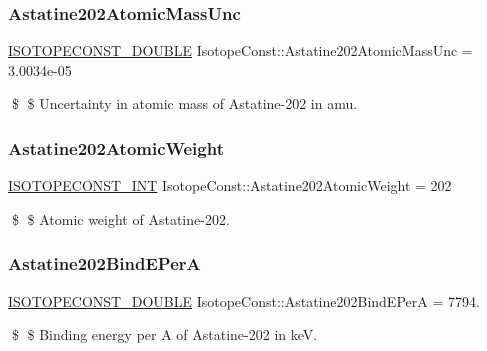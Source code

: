 \subsubsection{\texorpdfstring{Astatine202\+Atomic\+Mass\+Unc}{Astatine202AtomicMassUnc}}
{\footnotesize\ttfamily \mbox{\hyperlink{group___isotope_const-_macros_ga8f45a7272ce02c0b4c65c44636ed719a}{I\+S\+O\+T\+O\+P\+E\+C\+O\+N\+S\+T\+\_\+\+D\+O\+U\+B\+LE}} Isotope\+Const\+::\+Astatine202\+Atomic\+Mass\+Unc = 3.\+0034e-\/05}

\$ \$ Uncertainty in atomic mass of Astatine-\/202 in amu. \mbox{\label{group___isotope_const-_astatine-_at202_ga4b9a7531f90251ffd98a7b38ad1e87c6}} 
\subsubsection{\texorpdfstring{Astatine202\+Atomic\+Weight}{Astatine202AtomicWeight}}
{\footnotesize\ttfamily \mbox{\hyperlink{group___isotope_const-_macros_ga5f18360b3e99483a35c32d789e62621c}{I\+S\+O\+T\+O\+P\+E\+C\+O\+N\+S\+T\+\_\+\+I\+NT}} Isotope\+Const\+::\+Astatine202\+Atomic\+Weight = 202}

\$ \$ Atomic weight of Astatine-\/202. \mbox{\label{group___isotope_const-_astatine-_at202_gaa8a60150a4686e9f2609971f8ff8633a}} 
\subsubsection{\texorpdfstring{Astatine202\+Bind\+E\+PerA}{Astatine202BindEPerA}}
{\footnotesize\ttfamily \mbox{\hyperlink{group___isotope_const-_macros_ga8f45a7272ce02c0b4c65c44636ed719a}{I\+S\+O\+T\+O\+P\+E\+C\+O\+N\+S\+T\+\_\+\+D\+O\+U\+B\+LE}} Isotope\+Const\+::\+Astatine202\+Bind\+E\+PerA = 7794.}

\$ \$ Binding energy per A of Astatine-\/202 in keV. \mbox{\label{group___isotope_const-_astatine-_at202_ga377034bcde776a49ecfc9400985bcf43}} 

